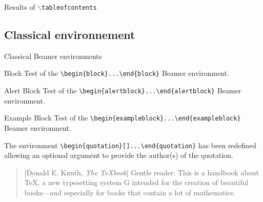 \documentclass[10pt,aspectratio=169,english]{beamer}
\begin{document}
\begin{frame}[fragile]{Results of \texttt{$\backslash$tableofcontents}}
  \tableofcontents
\end{frame}

\subsection{Classical environnement}

\begin{frame}{Classical Beamer environments}
  \begin{block}{Block}
    Test of the \lstinline+\begin{block}...\end{block}+ Beamer environment.
  \end{block}
  \begin{alertblock}{Alert Block}
    Test of the \lstinline+\begin{alertblock}...\end{alertblock}+ Beamer environment.
  \end{alertblock}
  \begin{exampleblock}{Example Block}
    Test of the \lstinline+\begin{exampleblock}...\end{exampleblock}+ Beamer environment.
  \end{exampleblock}

  \framebreak


  \begin{abstract}
    This is the result of the \lstinline+\begin{abstract}...\end{abstract}+
    environment.
  \end{abstract}


  The environment \lstinline+\begin{quotation}[+\lstinline+]...\end{quotation}+ has been
  redefined allowing an optional argument to provide the author(s) of the
  quotation.

  \begin{quotation}[Donald E. Knuth, \emph{The \TeX book}]
Gentle reader: This is a handbook about \TeX, a new typesetting system G
intended for the creation of beautiful books—and especially for books that
contain a lot of mathematics.
\end{quotation}


\end{frame}
\end{document}
